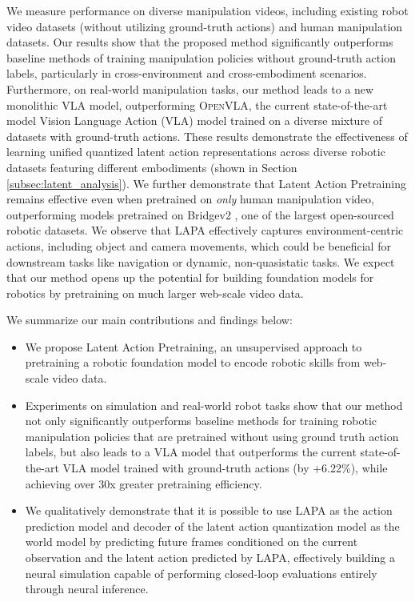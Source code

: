 \documentclass{article} %
\begin{document}
We measure performance on diverse manipulation videos, including existing robot video datasets (without utilizing ground-truth actions) and human manipulation datasets. Our results show that the proposed method significantly outperforms baseline methods of training manipulation policies {without ground-truth action labels}, particularly in cross-environment and cross-embodiment scenarios. Furthermore, on real-world manipulation tasks, our method leads to a new monolithic VLA model, outperforming \textsc{OpenVLA}, the current state-of-the-art model Vision Language Action (VLA) model trained on a diverse mixture of datasets with ground-truth actions. These results demonstrate the effectiveness of learning unified quantized latent action representations across diverse robotic datasets featuring different embodiments (shown in Section \ref{subsec:latent_analysis}). We further demonstrate that Latent Action Pretraining remains effective even when pretrained on \textit{only} human manipulation video, outperforming models pretrained on Bridgev2 {\citep{walke2023bridgedata}}, one of the largest open-sourced robotic datasets. We observe that LAPA effectively captures environment-centric actions, including object and camera movements, which could be beneficial for downstream tasks like navigation or dynamic, non-quasistatic tasks. We expect that our method opens up the potential for building foundation models for robotics by pretraining on much larger web-scale video data. 

We summarize our main contributions and findings below:
\begin{itemize}
    \item We propose Latent Action Pretraining, an unsupervised approach to pretraining a robotic foundation model to encode robotic skills from web-scale video data.    
    \item Experiments on simulation and real-world robot tasks show that our method not only significantly outperforms baseline methods for training robotic manipulation policies {that are pretrained without using ground truth action labels}, but also leads to a VLA model that outperforms the current state-of-the-art VLA model trained with ground-truth actions (by +6.22\%), while achieving over 30x greater pretraining efficiency. 
    \item We qualitatively demonstrate that it is possible to use {LAPA as the action prediction model and decoder of the latent action quantization model as the world model by predicting future frames conditioned on the current observation and the latent action predicted by LAPA,} effectively building a neural simulation capable of performing closed-loop evaluations entirely through neural inference.
\end{itemize}
\end{document}
